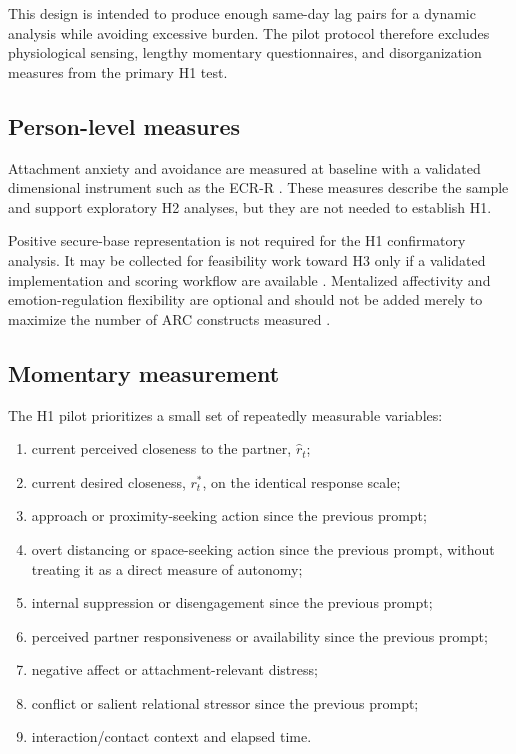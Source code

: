 This design is intended to produce enough same-day lag pairs for a dynamic analysis while avoiding excessive burden. The pilot protocol therefore excludes physiological sensing, lengthy momentary questionnaires, and disorganization measures from the primary H1 test.

\subsection{Person-level measures}

Attachment anxiety and avoidance are measured at baseline with a validated dimensional instrument such as the ECR-R \parencite{fraley2000irt,sibley2005ecrr}. These measures describe the sample and support exploratory H2 analyses, but they are not needed to establish H1.

Positive secure-base representation is not required for the H1 confirmatory analysis. It may be collected for feasibility work toward H3 only if a validated implementation and scoring workflow are available \parencite{waters2006workingmodels,waters2019securebase}. Mentalized affectivity and emotion-regulation flexibility are optional and should not be added merely to maximize the number of ARC constructs measured \parencite{greenberg2017mentalized,mosannenzadeh2024flexibility}.

\subsection{Momentary measurement}

The H1 pilot prioritizes a small set of repeatedly measurable variables:

\begin{enumerate}[label=(\arabic*)]
\item current perceived closeness to the partner, \(\hat r_t\);
\item current desired closeness, \(r^\ast_t\), on the identical response scale;
\item approach or proximity-seeking action since the previous prompt;
\item overt distancing or space-seeking action since the previous prompt, without treating it as a direct measure of autonomy;
\item internal suppression or disengagement since the previous prompt;
\item perceived partner responsiveness or availability since the previous prompt;
\item negative affect or attachment-relevant distress;
\item conflict or salient relational stressor since the previous prompt;
\item interaction/contact context and elapsed time.
\end{enumerate}

